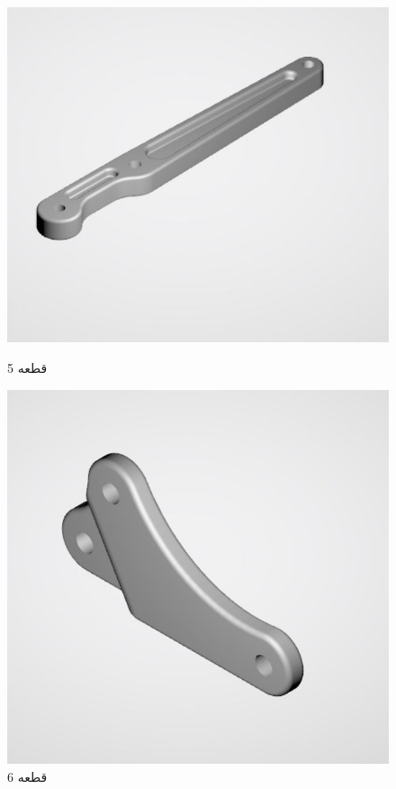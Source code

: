 \documentclass{article}
\begin{document}
\begin{figure}[H]
    \centering
    \begin{minipage}{0.5\linewidth}
        \centering
        \includegraphics[width=0.9\linewidth]{5.JPG}
        \caption{قطعه 5}
        \label{fig:label5}
    \end{minipage}%
    \begin{minipage}{0.5\linewidth}
        \centering
        \includegraphics[width=0.9\linewidth]{6.JPG}
        \caption{قطعه 6}
        \label{fig:label6}
    \end{minipage}
\end{figure}
\end{document}
